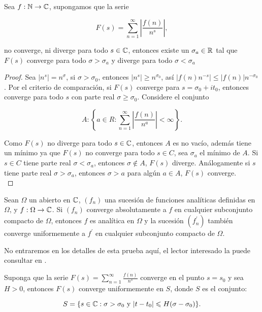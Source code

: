 \begin{theorem}
Sea $f:\mathbb{N} \to \mathbb{C}$, supongamos que la serie

$$F(s)=\sum_{n=1}^{\infty} \left| \frac{f(n)}{n^s}\right|,$$

no converge, ni diverge para  todo $s\in \mathbb{C}$, entonces existe un $\sigma_a\in \mathbb{R}$ tal que $F(s)$ converge para todo $\sigma>\sigma_a$ y diverge para todo $\sigma<\sigma_a$
\end{theorem}

\begin{proof}
Sea $|n^s|=n^{\sigma}$, si $\sigma>\sigma_0$, entonces $|n^s|\geq n^{\sigma_0}$, así $|f(n)n^{-s}|\leq|f(n)|n^{-\sigma_0}$. Por el criterio de comparación, si $F(s)$ converge para $s=\sigma_0+i t_0$, entonces converge para todo $s$ con parte real $\sigma\geq\sigma_0$. Considere el conjunto

$$A:\left\{a\in R : \sum_{n=1}^{\infty} \left|\frac{f(n)}{n^a}\right|<\infty\right\}.$$

Como $F(s)$ no diverge para  todo $s\in\mathbb{C} $, entonces $A$ es no vacío, además tiene un mínimo ya que $F(s)$ no converge  para todo $s\in C$, sea $\sigma_a$ el mínimo de $A$. Si $s\in C$ tiene parte real $\sigma< \sigma_a$, entonces $\sigma\not\in A$, $F(s)$ diverge. Análogamente si $s$ tiene parte real $\sigma>\sigma_a$, entonces $\sigma>a$ para algún $a\in A$, $F(s)$ converge.\\
\end{proof}


\begin{theorem}
Sean $\Omega$ un abierto en $\mathbb{C}$, $(f_n)$ una sucesión de funciones analíticas definidas en $\Omega$, y $f:\Omega\to\mathbb{C}$. Si $(f_n)$ converge absolutamente a $f$ en cualquier subconjunto compacto de $\Omega$, entonces $f$ es analítica en $\Omega$ y la sucesión $(f_n^{\prime})$ también converge uniformemente a $f^{\prime}$ en cualquier subconjunto compacto de $\Omega$.
\end{theorem}

No entraremos en los detalles de esta prueba aquí, el lector interesado la puede  consultar en \cite{stein2010complex}.

\begin{theorem}
Suponga que la serie $F(s)=\displaystyle\sum_{n=1}^{\infty} \frac{f(n)}{n^s}$ converge en el punto $s=s_0$ y sea $H>0$, entonces $F(s)$ converge uniformemente en $S$, donde $S$ es el conjunto:

$$S=\{s\in \mathbb{C} : \sigma>\sigma_0 \text{ y } |t-t_0|\leqslant H(\sigma-\sigma_0)\}.$$
\end{theorem}
\begin{center}

\end{center}

